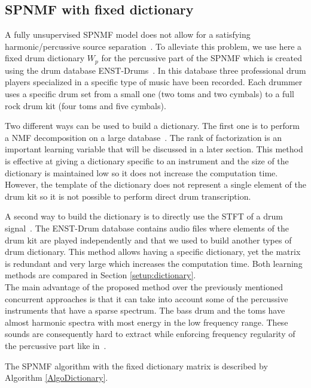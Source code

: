 \subsection{SPNMF with fixed dictionary}\label{fixedict}  

A fully unsupervised SPNMF model does not allow for a satisfying harmonic/percussive source separation~\cite{laroche2015structured}. To alleviate this problem, we use here a fixed drum dictionary $W_p$ for the percussive part of the SPNMF which is created using the drum database ENST-Drums~\cite{gillet2006enst}. In this database three professional drum players specialized in a specific type of music have been recorded. Each drummer uses a specific drum set from a small one (two toms and two cymbals) to a full rock drum kit (four toms and five cymbals). 

Two different ways can be used to build a dictionary. The first one is to perform a NMF decomposition on a large database~\cite{jaureguiberry2011adaptation}. The rank of factorization is an important learning variable that will be discussed in a later section. This method is effective at giving a dictionary specific to an instrument and the size of the dictionary is maintained low so it does not increase the computation time. However, the template of the dictionary does not represent a single element of the drum kit so it is not possible to perform direct drum transcription.

A second way to build the dictionary is to directly use the STFT of a drum signal~\cite{wudrum}. The ENST-Drum database contains audio files where elements of the drum kit are played independently and that we used to build another types of drum dictionary. This method allows having a specific dictionary, yet the matrix is redundant and very large which increases the computation time. Both learning methods are compared in Section \ref{setup:dictionary}. \\

The main advantage of the proposed method over the previously mentioned concurrent approaches is that it can take into account some of the percussive instruments that have a sparse spectrum. The bass drum and the toms have almost harmonic spectra with most energy in the low frequency range. These sounds are consequently hard to extract while enforcing frequency regularity of the percussive part like in~\cite{canadas2014percussive,ono2008separation}.

The SPNMF algorithm with the fixed dictionary matrix is described by Algorithm \ref{AlgoDictionary}.
 

